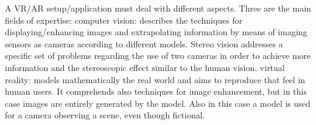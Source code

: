 A VR/AR setup/application must deal with different aspects. Three are the main fields of expertise:
computer vision: describes the techniques for displaying/enhancing images and extrapolating information by means of imaging sensors as cameras according to different models. Stereo vision addresses a specific set of  problems regarding the use of two cameras in order to achieve more information and the stereoscopic effect similar to the human vision.
virtual reality: models mathematically the real world and aims to reproduce that feel in human users. It comprehends also techniques for image enhancement, but in this case images are entirely generated by the model. Also in this case a model is used for a camera observing a scene, even though fictional.
